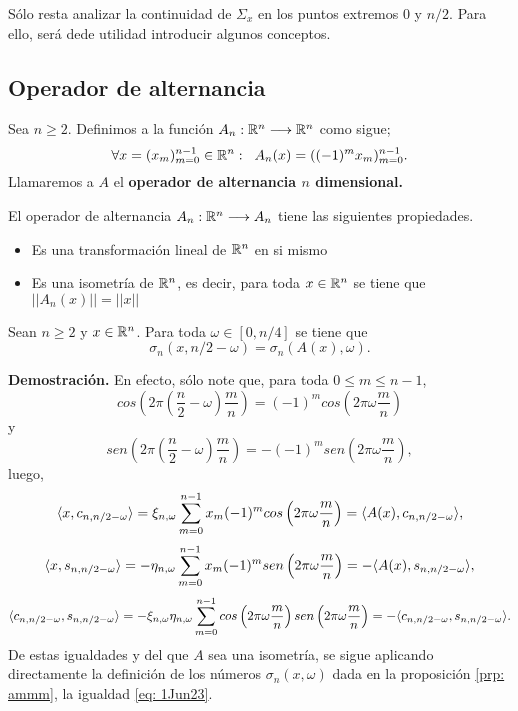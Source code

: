Sólo resta analizar la continuidad de 
$\Sigma_{x}$ en los puntos extremos $0$ y $n/2$.
Para ello,
será dede utilidad introducir algunos conceptos.

\subsection{Operador de alternancia}

\begin{defi}
Sea $n \geq 2$. Definimos a la función 
$A_{n}: \mathbb{R}^{n} \longrightarrow \mathbb{R}^{n}$ como sigue;
\[
\forall x= (x_{m})_{m=0}^{n-1} \in \mathbb{R}^{n}: \hspace{0.2cm}
A_{n}(x) = ((-1)^{m}x_{m})_{m=0}^{n-1}.
\]
Llamaremos a $A$ el \textbf{operador de alternancia $n$ dimensional.}
\end{defi}


\begin{obs}
El operador de alternancia $A_{n}: \mathbb{R}^{n} \longrightarrow A_{n}$
tiene las siguientes propiedades.
\begin{itemize}
\item Es una transformación lineal de $\mathbb{R}^{n}$ en si mismo
\item Es una isometría de $\mathbb{R}^{n}$, es decir, para toda
$x \in \mathbb{R}^{n}$ se tiene que $|| A_{n}(x) || = || x ||$
\end{itemize}
\end{obs}

\begin{prop}
\label{prop: operaodr de alternancia y sigmas}
Sean $n \geq 2$ y $x \in \mathbb{R}^{n}$. 
Para toda $\omega \in [0, n/4]$ se tiene que
\begin{equation}
	\label{eq: 1Jun23}
	\sigma_{n}(x, n/2-\omega) = \sigma_{n}(A(x), \omega).
\end{equation}
\end{prop}
\noindent
\textbf{Demostración.}
En efecto, sólo note que, para toda
$0 \leq m \leq n-1$,
\[
cos\left( 
2 \pi \left(
\frac{n}{2} - \omega
\right) \frac{m}{n}
\right) = 
(-1)^{m}
cos\left( 
2 \pi \omega \frac{m}{n}
\right)
\]
y 
\[
sen\left( 
2 \pi \left(
\frac{n}{2} - \omega
\right) \frac{m}{n}
\right) = 
-(-1)^{m}
sen\left( 
2 \pi \omega \frac{m}{n}
\right),
\]
luego, 
\[
\langle 
x, c_{n, n/2-\omega} 
\rangle
= 
\xi_{n, \omega} \sum\limits_{m=0}^{n-1}
x_{m}(-1)^{m} cos\left( 
2 \pi \omega \frac{m}{n}
\right)
 = \langle 
A(x), c_{n, n/2-\omega} 
\rangle,
\]
\[
\langle 
x, s_{n, n/2-\omega} 
\rangle
= 
-\eta_{n, \omega} \sum\limits_{m=0}^{n-1}
x_{m}(-1)^{m} sen\left( 
2 \pi \omega \frac{m}{n}
\right)
 = - \langle 
A(x), s_{n, n/2-\omega} 
\rangle,
\]
\[
\langle 
c_{n, n/2-\omega}, s_{n, n/2-\omega}
\rangle
= 
-\xi_{n, \omega} \eta_{n, \omega} \sum\limits_{m=0}^{n-1}
cos\left( 
2 \pi \omega \frac{m}{n}
\right) sen\left( 
2 \pi \omega \frac{m}{n}
\right)
 = - \langle 
c_{n, n/2-\omega}, s_{n, n/2-\omega}
\rangle.
\]
De estas igualdades y 
del que $A$ sea una isometría, se sigue aplicando
directamente
la definición de
los números $\sigma_{n}(x, \omega)$
dada en la proposición \ref{prp: ammm},
la igualdad \ref{eq: 1Jun23}.
\QEDB
\vspace{0.2cm}

